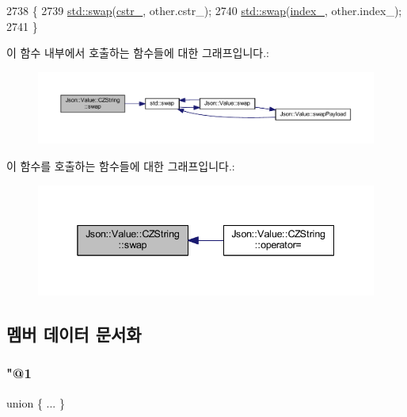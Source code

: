 \begin{DoxyCode}
2738                                         \{
2739   \hyperlink{namespacestd_a22cc6fcbbb1f2f705c7888b615e43582}{std::swap}(\hyperlink{class_json_1_1_value_1_1_c_z_string_a5b4d28349294034d7f779c3c95d0306c}{cstr\_}, other.cstr\_);
2740   \hyperlink{namespacestd_a22cc6fcbbb1f2f705c7888b615e43582}{std::swap}(\hyperlink{class_json_1_1_value_1_1_c_z_string_aecf29982235c9c165a0971023ebbb270}{index\_}, other.index\_);
2741 \}
\end{DoxyCode}
이 함수 내부에서 호출하는 함수들에 대한 그래프입니다.\+:\nopagebreak
\begin{figure}[H]
\begin{center}
\leavevmode
\includegraphics[width=350pt]{class_json_1_1_value_1_1_c_z_string_ad59f3542d2eea749a6a63409d1a02207_cgraph}
\end{center}
\end{figure}
이 함수를 호출하는 함수들에 대한 그래프입니다.\+:\nopagebreak
\begin{figure}[H]
\begin{center}
\leavevmode
\includegraphics[width=338pt]{class_json_1_1_value_1_1_c_z_string_ad59f3542d2eea749a6a63409d1a02207_icgraph}
\end{center}
\end{figure}


\subsection{멤버 데이터 문서화}
\mbox{\label{class_json_1_1_value_1_1_c_z_string_a6f6b20ee7c8873fba58100f869ca2e5e}} 
\subsubsection{\texorpdfstring{"@1}{@1}}
{\footnotesize\ttfamily union \{ ... \} \hspace{0.3cm}{\ttfamily [private]}}

